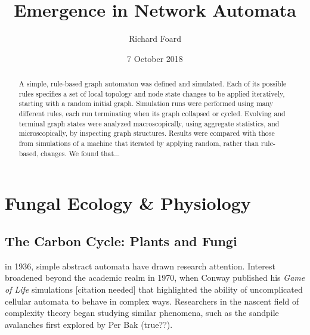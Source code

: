 \documentclass{tufte-handout}
\title{Emergence in Network Automata}
\author{Richard Foard}
\date{7 October 2018}  %
\begin{document}
\maketitle%


\begin{abstract}
\noindent A simple, rule-based
graph automaton was defined and simulated. Each of its possible rules specifies a set
of local topology and node state changes to be applied iteratively, starting with a random initial graph.
Simulation runs were performed using many different rules, each run terminating when its graph
collapsed or cycled.
Evolving and terminal graph states were analyzed macroscopically, using
aggregate statistics, and microscopically, by inspecting graph structures.
Results were compared with those from simulations of a machine that
iterated by applying random, rather than rule-based, changes. We found that...
\end{abstract}

\section{Fungal Ecology \&  Physiology}

\subsection{The Carbon Cycle: Plants and Fungi}

 in 1936, simple abstract automata have drawn research attention.
Interest broadened beyond the academic realm in 1970,
when Conway published his \textit{Game of Life} simulations [citation needed] that highlighted the ability
of uncomplicated cellular automata to behave in complex ways. Researchers in the
nascent field of complexity theory began studying similar phenomena, such as the
sandpile avalanches first explored by Per Bak (true??).
\end{document}
